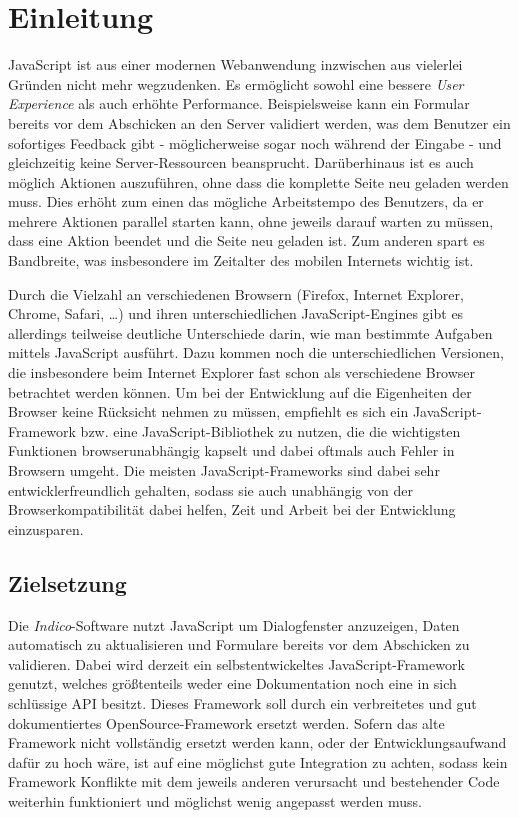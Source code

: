 \chapter{Einleitung}

JavaScript ist aus einer modernen Webanwendung inzwischen aus vielerlei Gründen nicht mehr
wegzudenken. Es ermöglicht sowohl eine bessere \emph{User Experience} als auch erhöhte Performance.
Beispielsweise kann ein Formular bereits vor dem Abschicken an den Server validiert werden, was dem
Benutzer ein sofortiges Feedback gibt - möglicherweise sogar noch während der Eingabe - und
gleichzeitig keine Server-Ressourcen beansprucht. Darüberhinaus ist es auch möglich Aktionen
auszuführen, ohne dass die komplette Seite neu geladen werden muss. Dies erhöht zum einen das
mögliche Arbeitstempo des Benutzers, da er mehrere Aktionen parallel starten kann, ohne jeweils darauf
warten zu müssen, dass eine Aktion beendet und die Seite neu geladen ist. Zum anderen spart es
Bandbreite, was insbesondere im Zeitalter des mobilen Internets wichtig ist.

Durch die Vielzahl an verschiedenen Browsern (Firefox, Internet Explorer, Chrome, Safari, \ldots) und ihren
unterschiedlichen JavaScript-Engines gibt es allerdings teilweise deutliche Unterschiede darin, wie
man bestimmte Aufgaben mittels JavaScript ausführt. Dazu kommen noch die unterschiedlichen Versionen,
die insbesondere beim Internet Explorer fast schon als verschiedene Browser betrachtet werden
können. Um bei der Entwicklung auf die Eigenheiten der Browser keine Rücksicht nehmen zu müssen,
empfiehlt es sich ein JavaScript-Framework bzw. eine JavaScript-Bibliothek zu nutzen, die die
wichtigsten Funktionen browserunabhängig kapselt und dabei oftmals auch Fehler in Browsern umgeht.
Die meisten JavaScript-Frameworks sind dabei sehr entwicklerfreundlich gehalten, sodass sie auch
unabhängig von der Browserkompatibilität dabei helfen, Zeit und Arbeit bei der Entwicklung
einzusparen.


\section{Zielsetzung}

Die \emph{Indico}-Software nutzt JavaScript um Dialogfenster anzuzeigen, Daten automatisch zu
aktualisieren und Formulare bereits vor dem Abschicken zu validieren. Dabei wird derzeit ein
selbstentwickeltes JavaScript-Framework genutzt, welches größtenteils weder eine Dokumentation
noch eine in sich schlüssige API besitzt. Dieses Framework soll durch ein verbreitetes und gut
dokumentiertes OpenSource-Framework ersetzt werden. Sofern das alte Framework nicht vollständig
ersetzt werden kann, oder der Entwicklungsaufwand dafür zu hoch wäre, ist auf eine möglichst gute
Integration zu achten, sodass kein Framework Konflikte mit dem jeweils anderen verursacht und
bestehender Code weiterhin funktioniert und möglichst wenig angepasst werden muss.

